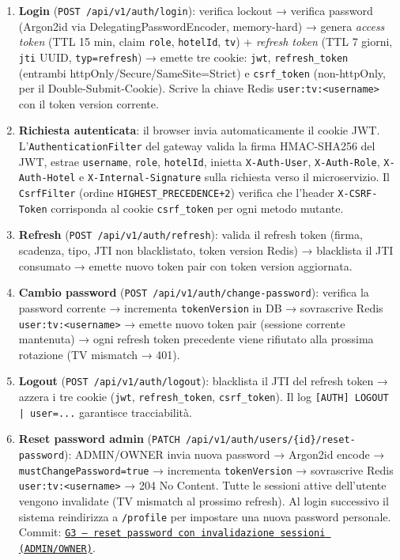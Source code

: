 ﻿\documentclass[a4paper,12pt]{report}
\newcommand{\commitref}[2]{\texttt{\small \href{https://github.com/diegoandruccioli/hotel-pms/commit/#1}{#2}}}
\begin{document}
\begin{enumerate}
  \item \textbf{Login} (\texttt{POST /api/v1/auth/login}):
    verifica lockout → verifica password (Argon2id via DelegatingPasswordEncoder, memory-hard) → genera
    \emph{access token} (TTL 15 min, claim \texttt{role}, \texttt{hotelId},
    \texttt{tv}) + \emph{refresh token} (TTL 7 giorni, \texttt{jti} UUID,
    \texttt{typ=refresh}) → emette tre cookie:
    \texttt{jwt}, \texttt{refresh\_token} (entrambi httpOnly/Secure/SameSite=Strict)
    e \texttt{csrf\_token} (non-httpOnly, per il Double-Submit-Cookie).
    Scrive la chiave Redis \texttt{user:tv:<username>} con il token version corrente.

  \item \textbf{Richiesta autenticata}:
    il browser invia automaticamente il cookie JWT.
    L'\texttt{AuthenticationFilter} del gateway valida la firma HMAC-SHA256
    del JWT, estrae \texttt{username}, \texttt{role}, \texttt{hotelId},
    inietta \texttt{X-Auth-User}, \texttt{X-Auth-Role}, \texttt{X-Auth-Hotel}
    e \texttt{X-Internal-Signature} sulla richiesta verso il microservizio.
    Il \texttt{CsrfFilter} (ordine \texttt{HIGHEST\_PRECEDENCE+2}) verifica
    che l'header \texttt{X-CSRF-Token} corrisponda al cookie \texttt{csrf\_token}
    per ogni metodo mutante.

  \item \textbf{Refresh} (\texttt{POST /api/v1/auth/refresh}):
    valida il refresh token (firma, scadenza, tipo, JTI non blacklistato,
    token version Redis) → blacklista il JTI consumato → emette nuovo
    token pair con token version aggiornata.

  \item \textbf{Cambio password} (\texttt{POST /api/v1/auth/change-password}):
    verifica la password corrente → incrementa \texttt{tokenVersion} in DB
    → sovrascrive Redis \texttt{user:tv:<username>} → emette nuovo token pair
    (sessione corrente mantenuta) → ogni refresh token precedente viene rifiutato
    alla prossima rotazione (TV mismatch → 401).

  \item \textbf{Logout} (\texttt{POST /api/v1/auth/logout}):
    blacklista il JTI del refresh token → azzera i tre cookie
    (\texttt{jwt}, \texttt{refresh\_token}, \texttt{csrf\_token}).
    Il log \texttt{[AUTH] LOGOUT | user=...} garantisce tracciabilità.

  \item \textbf{Reset password admin} (\texttt{PATCH /api/v1/auth/users/\{id\}/reset-password}):
    ADMIN/OWNER invia nuova password → Argon2id encode →
    \texttt{mustChangePassword=true} → incrementa \texttt{tokenVersion}
    → sovrascrive Redis \texttt{user:tv:<username>} → 204 No Content.
    Tutte le sessioni attive dell'utente vengono invalidate (TV mismatch
    al prossimo refresh). Al login successivo il sistema reindirizza a
    \texttt{/profile} per impostare una nuova password personale.
    Commit: \commitref{4e6a7f4}{G3 --- reset password con invalidazione sessioni (ADMIN/OWNER)}.
\end{enumerate}
\end{document}
